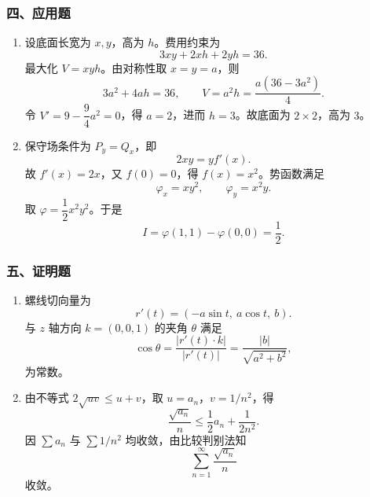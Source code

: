 \subsubsection*{四、应用题}
\begin{enumerate}
  \item 设底面长宽为 $x,y$，高为 $h$。费用约束为
  \[
  3xy+2xh+2yh=36.
  \]
  最大化 $V=xyh$。由对称性取 $x=y=a$，则
  \[
  3a^2+4ah=36,\qquad V=a^2h=\frac{a(36-3a^2)}4.
  \]
  令 $V'=9-\dfrac94a^2=0$，得 $a=2$，进而 $h=3$。故底面为 $2\times2$，高为 $3$。
  \item 保守场条件为 $P_y=Q_x$，即
  \[
  2xy=yf'(x).
  \]
  故 $f'(x)=2x$，又 $f(0)=0$，得 $f(x)=x^2$。势函数满足
  \[
  \varphi_x=xy^2,\qquad \varphi_y=x^2y.
  \]
  取 $\varphi=\dfrac12x^2y^2$。于是
  \[
  I=\varphi(1,1)-\varphi(0,0)=\frac12.
  \]
\end{enumerate}

\subsubsection*{五、证明题}
\begin{enumerate}
  \item 螺线切向量为
  \[
  r'(t)=(-a\sin t,\ a\cos t,\ b).
  \]
  与 $z$ 轴方向 $k=(0,0,1)$ 的夹角 $\theta$ 满足
  \[
  \cos\theta=\frac{|r'(t)\cdot k|}{|r'(t)|}=\frac{|b|}{\sqrt{a^2+b^2}},
  \]
  为常数。
  \item 由不等式 $2\sqrt{uv}\le u+v$，取 $u=a_n$，$v=1/n^2$，得
  \[
  \frac{\sqrt{a_n}}{n}\le\frac12a_n+\frac1{2n^2}.
  \]
  因 $\sum a_n$ 与 $\sum1/n^2$ 均收敛，由比较判别法知
  \[
  \sum_{n=1}^{\infty}\frac{\sqrt{a_n}}{n}
  \]
  收敛。
\end{enumerate}

